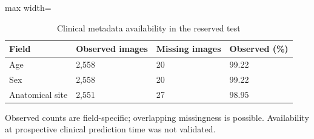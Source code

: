 \begin{table}[t]
\centering
\small
\caption{Clinical metadata availability in the reserved test}
\label{tab:12-metadata-coverage}
\begin{adjustbox}{max width=\textwidth}
\begin{tabular}{llll}
\toprule
\textbf{Field} & \textbf{Observed images} & \textbf{Missing images} & \textbf{Observed (\%)} \\
\midrule
Age & 2,558 & 20 & 99.22 \\
Sex & 2,558 & 20 & 99.22 \\
Anatomical site & 2,551 & 27 & 98.95 \\
\bottomrule
\end{tabular}
\end{adjustbox}
\par\smallskip
\begin{minipage}{\textwidth}\footnotesize Observed counts are field-specific; overlapping missingness is possible. Availability at prospective clinical prediction time was not validated.\end{minipage}
\end{table}
